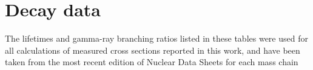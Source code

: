 
\section{Decay data} \label{sec:fe_data}
% 
The   lifetimes and gamma-ray branching ratios  listed in these tables were used for all calculations of measured cross sections reported in this work, and have been taken from the most recent edition of  Nuclear Data Sheets for each  mass chain 





